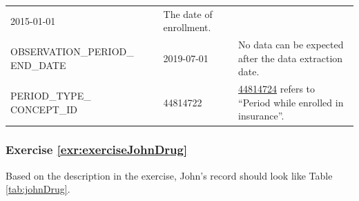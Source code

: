\documentclass[11pt]{book}
\theoremstyle{definition}
\theoremstyle{definition}
\theoremstyle{definition}
\theoremstyle{remark}
\begin{document}
\begin{longtable}[]{@{}lll@{}}
\begin{minipage}[t]{0.14\columnwidth}
2015-01-01\strut
\end{minipage} & \begin{minipage}[t]{0.48\columnwidth}\raggedright\strut
The date of enrollment.\strut
\end{minipage}\tabularnewline
\begin{minipage}[t]{0.29\columnwidth}\raggedright\strut
OBSERVATION\_PERIOD\_ END\_DATE\strut
\end{minipage} & \begin{minipage}[t]{0.14\columnwidth}\raggedright\strut
2019-07-01\strut
\end{minipage} & \begin{minipage}[t]{0.48\columnwidth}\raggedright\strut
No data can be expected after the data extraction date.\strut
\end{minipage}\tabularnewline
\begin{minipage}[t]{0.29\columnwidth}\raggedright\strut
PERIOD\_TYPE\_ CONCEPT\_ID\strut
\end{minipage} & \begin{minipage}[t]{0.14\columnwidth}\raggedright\strut
44814722\strut
\end{minipage} & \begin{minipage}[t]{0.48\columnwidth}\raggedright\strut
\href{http://athena.ohdsi.org/search-terms/terms/44814722}{44814724}
refers to ``Period while enrolled in insurance''.\strut
\end{minipage}\tabularnewline
\bottomrule
\end{longtable}

\subsubsection*{Exercise
\ref{exr:exerciseJohnDrug}}\label{exercise-refexrexercisejohndrug}

Based on the description in the exercise, John's record should look like
Table \ref{tab:johnDrug}.
\end{document}

